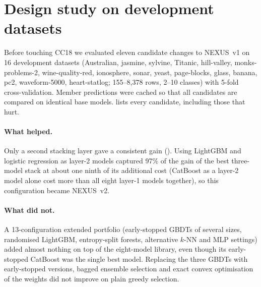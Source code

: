 \section{Design study on development datasets}
\label{sec:dev}

Before touching CC18 we evaluated eleven candidate changes to NEXUS~v1 on 16
development datasets (Australian, jasmine, sylvine, Titanic, hill-valley,
monks-problems-2, wine-quality-red, ionosphere, sonar, yeast, page-blocks,
glass, banana, pc2, waveform-5000, heart-statlog; 155--8{,}378 rows, 2--10
classes) with 5-fold cross-validation. Member predictions were cached so that all
candidates are compared on identical base models.  lists every
candidate, including those that hurt.

\begin{table}[t]
\centering
\caption{Every design candidate evaluated on the 16 development datasets,
relative to NEXUS~v1. $\Delta R^2$: mean reduction in log loss as a fraction of
label entropy (percentage points). Rel.\ LL / Rel.\ err.: mean relative
reduction of log loss / classification error. Wins: datasets where the candidate
has lower log loss than v1. The bold row was frozen as NEXUS~v2.}
\label{tab:dev}
\small

\end{table}

\paragraph{What helped.} Only a second stacking layer gave a consistent gain
(). Using LightGBM and logistic regression as layer-2 models
captured 97\% of the gain of the best three-model stack at about one ninth of
its additional cost (CatBoost as a layer-2 model alone cost more than all eight
layer-1 models together), so this configuration became NEXUS~v2.

\paragraph{What did not.} A 13-configuration extended portfolio (early-stopped
GBDTs of several sizes, randomised LightGBM, entropy-split forests, alternative
$k$-NN and MLP settings) added almost nothing on top of the eight-model library,
even though its early-stopped CatBoost was the single best model. Replacing the
three GBDTs with early-stopped versions, bagged ensemble selection
\citep{caruana2006getting} and exact convex optimisation of the weights did not
improve on plain greedy selection.


